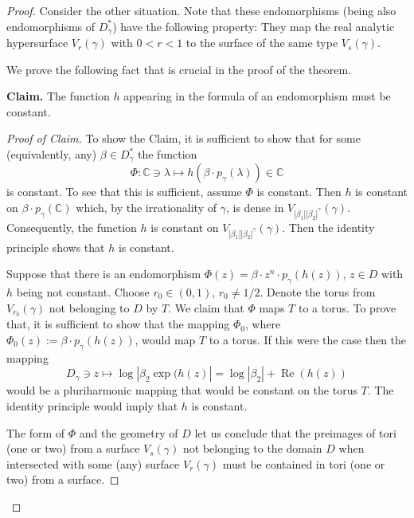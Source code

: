 \documentclass[10pt,a4paper]{amsart}
\begin{document}
\begin{proof}
Consider the other situation. Note that these endomorphisms (being also endomorphisms of $D_{\gamma}^*$) have the following property: They map the real analytic hypersurface $V_r(\gamma)$ with $0<r<1$ to the surface of the same type $V_s(\gamma)$. 

We prove the following fact that is crucial in the proof of the theorem.

\bigskip

{\bf Claim.} The function $h$ appearing in the formula of an endomorphism must be constant. 

\begin{proof}[Proof of Claim] To show the Claim, it is sufficient to show that for some (equivalently, any) $\beta\in D_{\gamma}^*$ the function
\begin{equation}
 \Phi \colon \mathbb C\owns\lambda \mapsto h(\beta\cdot p_{\gamma}(\lambda))\in\mathbb C
\end{equation}
is constant. To see that this is sufficient, assume $\Phi$ is constant. Then $h$ is constant on $\beta\cdot p_{\gamma}(\mathbb C)$ which, by the irrationality of $\gamma$, is dense in
$V_{|\beta_1||\beta_2|^{\gamma}}(\gamma)$. Consequently, the function $h$ is constant on $V_{|\beta_1||\beta_2|^{\gamma}}(\gamma)$. Then the identity principle shows that $h$ is constant.

Suppose that there is an endomorphism $\Phi(z)=\beta\cdot z^n\cdot p_{\gamma}(h(z))$, $z\in D$ with $h$ being not constant. Choose $r_0\in(0,1)$, $r_0\neq 1/2$. Denote the torus from $V_{r_0}(\gamma)$ not belonging to $D$ by $T$. We claim that $\Phi$ maps $T$ to a torus. To prove that, it is sufficient to show that the mapping $\Phi_0$, where $\Phi_0(z):=\beta\cdot p_{\gamma}(h(z))$, would map $T$ to a torus. If this were the case then the mapping 
\begin{equation}
    D_{\gamma}\owns z \mapsto \log |\beta_2 \exp(h(z)|=\log|\beta_2|+\operatorname{Re}(h(z))
\end{equation}
would be a pluriharmonic mapping that would be constant on the torus $T$. The identity principle would imply that $h$ is constant.

The form of $\Phi$ and the geometry of $D$ let us conclude that the preimages of tori (one or two) from a surface $V_s(\gamma)$ not belonging to the domain $D$ when intersected with some (any) surface $V_r(\gamma)$ must be contained in tori (one or two) from a surface.


\end{proof}
\end{proof}
\end{document}
